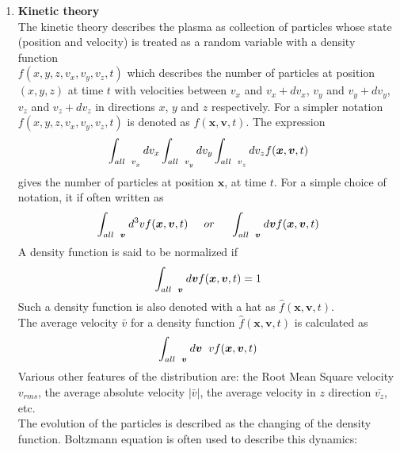 \documentclass[12pt]{article}
\begin{document}
\begin{enumerate}
		\item \textbf{Kinetic theory} \\
		The kinetic theory describes the plasma as collection of particles whose state (position and velocity) is treated as a random variable with a density function \\ $ f(x, y, z, v_{x}, v_{y}, v_{z}, t) $ which describes the number of particles at position $ (x, y, z) $ at time $ t $ with velocities between $ v_{x} $ and $ v_{x} + dv_{x} $, $ v_{y} $ and $ v_{y} + dv_{y} $, $ v_{z} $ and $ v_{z} + dv_{z} $ in directions $x$, $y$ and $z$ respectively. For a simpler notation $ f(x, y, z, v_{x}, v_{y}, v_{z}, t) $ is denoted as $ f(\boldsymbol{x}, \boldsymbol{v}, t) $.
		The expression $$\displaystyle \int_{all \hspace{0.2cm} v_{x}^{}} dv_{x} \int_{all \hspace{0.2cm} v_{y}^{}} dv_{y} \int_{all \hspace{0.2cm} v_{z}^{}} dv_{z} f(\boldsymbol{x}, \boldsymbol{v}, t) $$ gives the number of particles at position $\boldsymbol{x}$, at time $t$.  For a simple choice of notation, it if often written as $$\displaystyle \int_{all \hspace{0.2cm} \boldsymbol{v}^{}} d^{3}v f(\boldsymbol{x}, \boldsymbol{v}, t) \hspace{0.5cm}\mathnormal{or} \hspace{0.5cm}\int_{all \hspace{0.2cm} \boldsymbol{v}^{}} d\boldsymbol{v} f(\boldsymbol{x}, \boldsymbol{v}, t)$$ A density function is said to be normalized if $$\displaystyle \int_{all \hspace{0.2cm} \boldsymbol{v}^{}} d\boldsymbol{v} f(\boldsymbol{x}, \boldsymbol{v}, t) = 1$$ Such a density function is also denoted with a hat as $ \hat{f}(\boldsymbol{x}, \boldsymbol{v}, t) $.\\
		\noindent The average velocity $\bar{v}$ for a density function $ \hat{f}(\boldsymbol{x}, \boldsymbol{v}, t) $ is calculated as  $$\displaystyle \int_{all \hspace{0.2cm} \boldsymbol{v}^{}} d\boldsymbol{v} \hspace{0.2cm} v f(\boldsymbol{x}, \boldsymbol{v}, t)$$ Various other features of the distribution are: the Root Mean Square velocity $v_{rms}$, the average absolute velocity $|\bar{v}|$, the average velocity in $z$ direction $\bar{v_{z}}$, etc.\\
		The evolution of the particles is described as the changing of the density function. Boltzmann equation is often used to describe this dynamics:
		

\end{enumerate}
\end{document}
